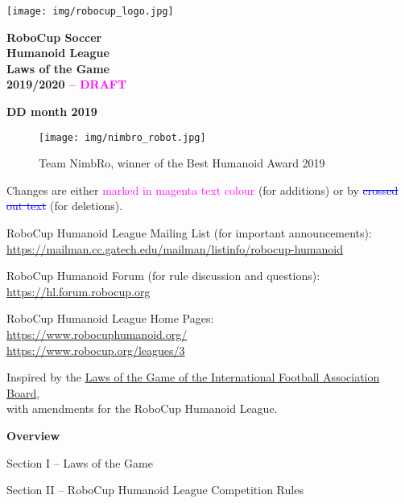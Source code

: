 \documentclass[a4paper]{article}
\title{}
\author{\rulesauthor}
\date{2018-11-04}
\newcommand{\removed}[1]{\textcolor{blue}{\sout{#1}}}
\newcommand{\added}[1]{\textcolor{magenta}{#1}}
\begin{document}
\sffamily

\begin{center}
\texttt{[image: img/robocup\_logo.jpg]}

{\Huge \bfseries
RoboCup Soccer
\\
Humanoid League
\\
Laws of the Game
\\ \vspace{0.5cm}
2019/2020 \added{-- DRAFT} }

\bigskip

{\bfseries DD month 2019}
\end{center}

\begin{figure}[!h]
\centering
\texttt{[image: img/nimbro\_robot.jpg]}
\captionsetup{labelformat=empty}
\caption{Team NimbRo, winner of the Best Humanoid Award 2019}
\end{figure}

{\large Changes are either \added{marked in magenta text colour} (for additions) or by  \removed{crossed out text} (for deletions).}

\bigskip
RoboCup Humanoid League Mailing List (for important announcements):\\
\url{https://mailman.cc.gatech.edu/mailman/listinfo/robocup-humanoid}

\medskip
RoboCup Humanoid Forum (for rule discussion and questions):\\
\url{https://hl.forum.robocup.org}

\medskip
RoboCup Humanoid League Home Pages:\\
\url{https://www.robocuphumanoid.org/}\\
\url{https://www.robocup.org/leagues/3}

\medskip
Inspired by the \href{https://resources.fifa.com/image/upload/laws-of-the-game-2018-19.pdf?cloudid=khhloe2xoigyna8juxw3}{\textcolor[rgb]{0,0,0.5}{Laws of the Game of the International Football Association Board}},\\
with amendments for the RoboCup Humanoid League.

\setcounter{figure}{0}

\clearpage

{\bfseries\color[rgb]{0.4,0.4,0.4}
Overview}

\bigskip

Section I -- Laws of the Game

\bigskip

Section II -- RoboCup Humanoid League Competition Rules
\end{document}
